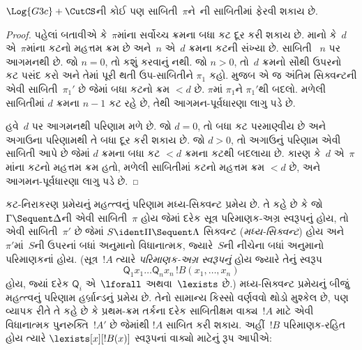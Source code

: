 \begin{thm}
$\Log{G3c} + \CutCS$ની કોઈ પણ
સાબિતી~$\pi$ને~ની
સાબિતીમાં ફેરવી શકાય છે.
\end{thm}

\begin{proof}
  પહેલાં બતાવીએ કે~$\pi$માંના સર્વોચ્ચ
  ક્રમના બધા કટ દૂર કરી શકાય છે.
  માનો કે~$d$ એ~$\pi$માંના કટનો
  મહત્તમ ક્રમ છે અને~$n$ એ~$d$
  ક્રમના કટની સંખ્યા છે. સાબિતી
  ~$n$ પર આગમનથી છે.
  જો $n=0$, તો કશું કરવાનું નથી.
  જો $n>0$, તો~$d$ ક્રમનો
  સૌથી ઉપરનો કટ પસંદ કરો અને
  તેમાં પૂરી થતી ઉપ-સાબિતીને
  $\pi_1$ કહો.
   મુજબ
  એ જ અંતિમ સિક્વન્ટની એવી
  સાબિતી~$\pi_1'$ છે જેમાં
  બધા કટનો ક્રમ $<d$ છે.
  $\pi$માં $\pi_1$ને $\pi_1'$થી
  બદલો. મળેલી સાબિતીમાં
  $d$ ક્રમના $n-1$ કટ રહે છે,
  તેથી આગમન-પૂર્વધારણા લાગુ પડે છે.

  હવે~$d$ પર આગમનથી પરિણામ મળે છે.
  જો $d=0$, તો બધા કટ પરમાણ્વીય છે
  અને અગાઉના પરિણામથી તે બધા
  દૂર કરી શકાય છે. જો $d>0$,
  તો અગાઉનું પરિણામ એવી સાબિતી આપે
  છે જેમાં $d$ ક્રમના બધા કટ
  $<d$ ક્રમના કટથી બદલાયા છે.
  કારણ કે~$d$ એ~$\pi$માંના કટનો
  મહત્તમ ક્રમ હતો, મળેલી સાબિતીમાં
  કટનો મહત્તમ ક્રમ $<d$ છે,
  અને આગમન-પૂર્વધારણા લાગુ પડે છે.
\end{proof}
\endgroup

\begingroup
\makeatletter{}\makeatother


\label{guunit:OLP-0661}


કટ-નિરાકરણ પ્રમેયનું મહત્ત્વનું
પરિણામ મધ્ય-સિક્વન્ટ પ્રમેય છે.
તે કહે છે કે જો
$\Gamma \Sequent \Delta$ની
એવી સાબિતી~$\pi$ હોય
જેમાં દરેક સૂત્ર પરિમાણક-અગ્ર
સ્વરૂપનું હોય, તો એવી
સાબિતી~$\pi'$ છે જેમાં
$S \ident \Pi \Sequent \Lambda$
સિક્વન્ટ (\emph{મધ્ય-સિક્વન્ટ})
હોય અને~$\pi'$માં~$S$ની
ઉપરનાં બધાં અનુમાનો વિધાનાત્મક,
જ્યારે~$S$ની નીચેના બધાં અનુમાનો
પરિમાણકનાં હોય.
(સૂત્ર~$!A$ ત્યારે
\emph{પરિમાણક-અગ્ર સ્વરૂપનું}
હોય જ્યારે તેનું સ્વરૂપ
\[\mathsf{Q}_1x_1\dots\mathsf{Q}_nx_n\,!B(x_1,\dots,x_n)\]
હોય, જ્યાં દરેક
$\mathsf{Q}_i$ એ~$\lforall$
અથવા~$\lexists$ છે.)
મધ્ય-સિક્વન્ટ પ્રમેયનું બીજું
મહત્ત્વનું પરિણામ હર્બ્રાન્ડનું
પ્રમેય છે. તેનો સામાન્ય કિસ્સો
વર્ણવવો થોડો મુશ્કેલ છે,
પણ વ્યાપક રીતે તે કહે છે કે
પ્રથમ-ક્રમ તર્કના દરેક
સાબિતીક્ષમ વાક્ય~$!A$
માટે એવી વિધાનાત્મક
પુનરુક્તિ~$!A'$ છે જેમાંથી
$!A$ સાબિત કરી શકાય.
અહીં~$!B$ પરિમાણક-રહિત હોય ત્યારે
$\lexists[x][!B(x)]$ સ્વરૂપનાં
વાક્યો માટેનું રૂપ આપીએ:

